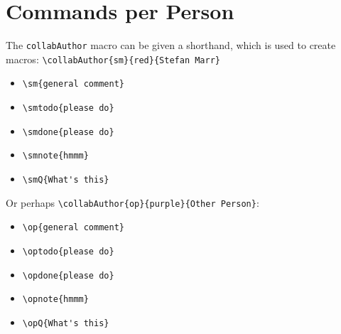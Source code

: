 \documentclass{article}
\begin{document}
\section{Commands per Person}

The \verb|collabAuthor| macro can be given a shorthand, which is used to create macros:
\verb|\collabAuthor{sm}{red}{Stefan Marr}|

\begin{itemize}
  \item \verb|\sm{general comment}| 
  \item \verb|\smtodo{please do}| 
  \item \verb|\smdone{please do}| 
  \item \verb|\smnote{hmmm}| 
  \item \verb|\smQ{What's this}| 
\end{itemize}

Or perhaps \verb|\collabAuthor{op}{purple}{Other Person}|:

\begin{itemize}
  \item \verb|\op{general comment}| 
  \item \verb|\optodo{please do}| 
  \item \verb|\opdone{please do}| 
  \item \verb|\opnote{hmmm}| 
  \item \verb|\opQ{What's this}| 
\end{itemize}
\end{document}
